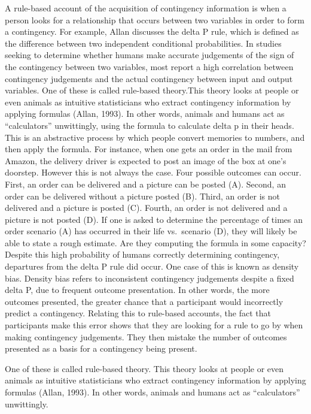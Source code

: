 \documentclass[
  english,
  man,floatsintext]{apa6}
\begin{document}
A rule-based account of the acquisition of contingency information is when a person looks for a relationship that occurs between two variables in order to form a contingency. For example, Allan discusses the delta P rule, which is defined as the difference between two independent conditional probabilities. In studies seeking to determine whether humans make accurate judgements of the sign of the contingency between two variables, most report a high correlation between contingency judgements and the actual contingency between input and output variables. One of these is called rule-based theory.This theory looks at people or even animals as intuitive statisticians who extract contingency information by applying formulas (Allan, 1993). In other words, animals and humans act as \enquote{calculators} unwittingly, using the formula to calculate delta p in their heads. This is an abstractive process by which people convert memories to numbers, and then apply the formula. For instance, when one gets an order in the mail from Amazon, the delivery driver is expected to post an image of the box at one's doorstep. However this is not always the case. Four possible outcomes can occur. First, an order can be delivered and a picture can be posted (A). Second, an order can be delivered without a picture posted (B). Third, an order is not delivered and a picture is posted (C). Fourth, an order is not delivered and a picture is not posted (D). If one is asked to determine the percentage of times an order scenario (A) has occurred in their life vs.~scenario (D), they will likely be able to state a rough estimate. Are they computing the formula in some capacity? Despite this high probability of humans correctly determining contingency, departures from the delta P rule did occur. One case of this is known as density bias. Density bias refers to inconsistent contingency judgements despite a fixed delta P, due to frequent outcome presentation. In other words, the more outcomes presented, the greater chance that a participant would incorrectly predict a contingency. Relating this to rule-based accounts, the fact that participants make this error shows that they are looking for a rule to go by when making contingency judgements. They then mistake the number of outcomes presented as a basis for a contingency being present.

One of these is called rule-based theory. This theory looks at people or even animals as intuitive statisticians who extract contingency information by applying formulas (Allan, 1993). In other words, animals and humans act as \enquote{calculators} unwittingly.
\end{document}
